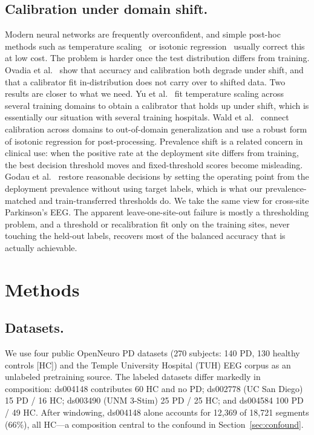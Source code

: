 \documentclass[runningheads]{llncs}
\begin{document}
\subsection{Calibration under domain shift.}
Modern neural networks are frequently overconfident, and simple post-hoc methods such as temperature scaling~\cite{guo2017calibration} or isotonic regression~\cite{zadrozny2002} usually correct this at low cost. The problem is harder once the test distribution differs from training. Ovadia et al.~\cite{ovadia2019} show that accuracy and calibration both degrade under shift, and that a calibrator fit in-distribution does not carry over to shifted data. Two results are closer to what we need. Yu et al.~\cite{yu2022multidomain} fit temperature scaling across several training domains to obtain a calibrator that holds up under shift, which is essentially our situation with several training hospitals. Wald et al.~\cite{wald2021} connect calibration across domains to out-of-domain generalization and use a robust form of isotonic regression for post-processing. Prevalence shift is a related concern in clinical use: when the positive rate at the deployment site differs from training, the best decision threshold moves and fixed-threshold scores become misleading. Godau et al.~\cite{godau2023} restore reasonable decisions by setting the operating point from the deployment prevalence without using target labels, which is what our prevalence-matched and train-transferred thresholds do. We take the same view for cross-site Parkinson's EEG. The apparent leave-one-site-out failure is mostly a thresholding problem, and a threshold or recalibration fit only on the training sites, never touching the held-out labels, recovers most of the balanced accuracy that is actually achievable.

\section{Methods}

\subsection{Datasets.}
We use four public OpenNeuro PD datasets (270 subjects: 140 PD, 130 healthy controls [HC]) and the Temple University Hospital (TUH) EEG corpus as an unlabeled pretraining source. The labeled datasets differ markedly in composition: ds004148 contributes 60 HC and no PD; ds002778 (UC San Diego) 15 PD / 16 HC; ds003490 (UNM 3-Stim) 25 PD / 25 HC; and ds004584 100 PD / 49 HC. After windowing, ds004148 alone accounts for 12{,}369 of 18{,}721 segments (66\%), all HC---a composition central to the confound in Section~\ref{sec:confound}.
\end{document}
